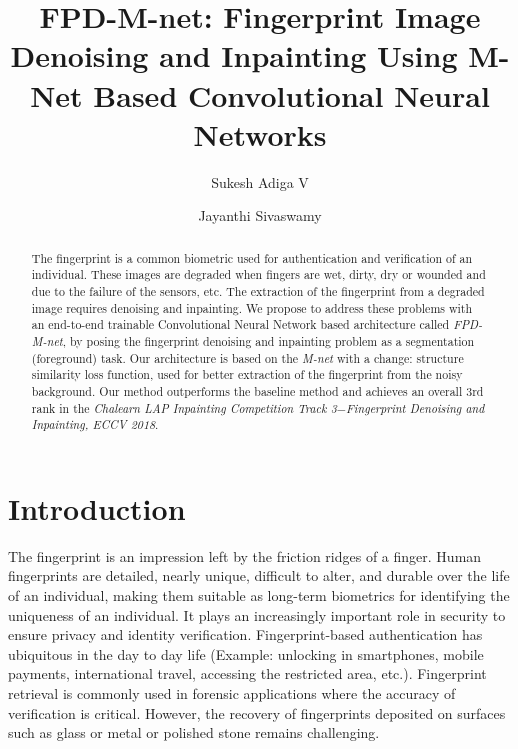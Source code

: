 \documentclass{llncs}
\begin{document}
\title{FPD-M-net: Fingerprint Image Denoising and Inpainting Using M-Net Based Convolutional Neural Networks}

\author{Sukesh Adiga V \and Jayanthi Sivaswamy}

\maketitle              %
\begin{abstract}
The fingerprint is a common biometric used for authentication and verification of an individual. These images are degraded when fingers are wet, dirty, dry or wounded and due to the failure of the sensors, etc. The extraction of the fingerprint from a degraded image requires denoising and inpainting. We propose to address these problems with an end-to-end trainable Convolutional Neural Network based architecture called \textit{FPD-M-net}, by posing the fingerprint denoising and inpainting problem as a segmentation (foreground) task. Our architecture is based on the \textit{M-net} with a change: structure similarity loss function, used for better extraction of the fingerprint from the noisy background. Our method outperforms the baseline method and achieves an overall 3rd rank in the \textit{Chalearn LAP Inpainting Competition Track 3$ - $Fingerprint Denoising and Inpainting, ECCV 2018}.


\end{abstract}


\section{Introduction}
\label{sec:introduction}
The fingerprint is an impression left by the friction ridges of a finger. Human fingerprints are detailed, nearly unique, difficult to alter, and durable over the life of an individual, making them suitable as long-term biometrics for identifying the uniqueness of an individual. It plays an increasingly important role in security to ensure privacy and identity verification. Fingerprint-based authentication has ubiquitous in the day to day life (Example: unlocking in smartphones, mobile payments, international travel, accessing the restricted area, etc.). Fingerprint retrieval is commonly used in forensic applications where the accuracy of verification is critical. However, the recovery of fingerprints deposited on surfaces such as glass or metal or polished stone remains challenging.
\end{document}
